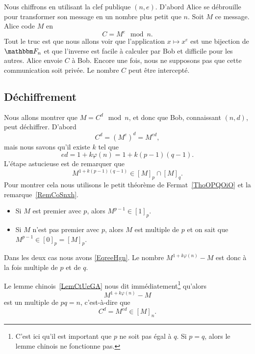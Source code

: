 Nous chiffrons en utilisant la clef publique \( (n,e)\). D'abord Alice se débrouille pour transformer son message en un nombre plus petit que \( n\). Soit \( M\) ce message. Alice code \( M\) en
\begin{equation}
    C=M^e\mod n.
\end{equation}
Tout le truc est que nous allons voir que l'application \( x\mapsto x^e\) est une bijection de \( \eF_n\) et que l'inverse est facile à calculer par Bob et difficile pour les autres. Alice envoie \( C\) à Bob. Encore une fois, nous ne supposons pas que cette communication soit privée. Le nombre \( C\) peut être intercepté.

\subsection{Déchiffrement}

Nous allons montrer que \( M=C^d\mod n\), et donc que Bob, connaissant \( (n,d)\), peut déchiffrer. D'abord
\begin{equation}
    C^d=(M^e)^d=M^{ed},
\end{equation}
mais nous savons qu'il existe \( k\) tel que
\begin{equation}
    ed=1+k\varphi(n)=1+k(p-1)(q-1).
\end{equation}
L'étape astucieuse est de remarquer que
\begin{equation}    \label{EqreeHgn}
    M^{1+k(p-1)(q-1)}\in [M]_p\cap[M]_q.
\end{equation}
Pour montrer cela nous utilisons le petit théorème de Fermat~\ref{ThoOPQOiO} et la remarque~\ref{RemCoSnxh}.
\begin{itemize}
    \item Si \( M\) est premier avec \( p\), alors \( M^{p-1}\in[1]_p\).
    \item Si \( M\) n'est pas premier avec \( p\), alors \( M\) est multiple de \( p\) et on sait que \( M^{p-1}\in[0]_p=[M]_p\).
\end{itemize}
Dans les deux cas nous avons \eqref{EqreeHgn}. Le nombre \( M^{1+k\varphi(n)}-M\) est donc à la fois multiple de \( p\) et de \( q\).

Le lemme chinois~\ref{LemCtUeGA} nous dit immédiatement\footnote{C'est ici qu'il est important que \( p\) ne soit pas égal à \( q\). Si \( p=q\), alors le lemme chinois ne fonctionne pas.} qu'alors
\begin{equation}
    M^{1+k\varphi(n)}-M
\end{equation}
est un multiple de \( pq=n\), c'est-à-dire que
\begin{equation}
    C^d=M^{ed}\in [M]_n.
\end{equation}

